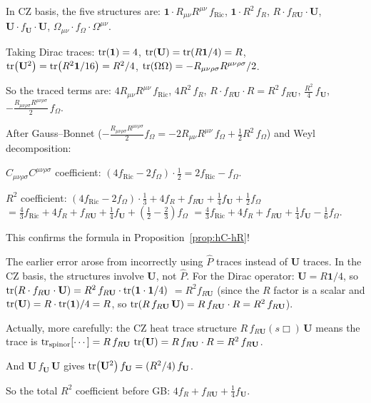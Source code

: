 \documentclass[11pt,a4paper]{article}
\newcommand{\Id}{\mathbf{1}}
\newcommand{\Ricsq}{R_{\mu\nu}R^{\mu\nu}}
\newcommand{\Rsq}{R_{\mu\nu\rho\sigma}R^{\mu\nu\rho\sigma}}
\newcommand{\Weylsq}{C_{\mu\nu\rho\sigma}C^{\mu\nu\rho\sigma}}
\theoremstyle{definition}
\theoremstyle{remark}
\begin{document}
In CZ basis, the five structures are:
$\Id\cdot\Ricsq\,f_{\text{Ric}}$,
$\Id\cdot R^2\,f_R$,
$R\cdot f_{R\mathbf{U}}\cdot\mathbf{U}$,
$\mathbf{U}\cdot f_{\mathbf{U}}\cdot\mathbf{U}$,
$\Omega_{\mu\nu}\cdot f_\Omega\cdot\Omega^{\mu\nu}$.

Taking Dirac traces:
$\tr(\Id) = 4$,
$\tr(\mathbf{U}) = \tr(R\Id/4) = R$,
$\tr(\mathbf{U}^2) = \tr(R^2\Id/16) = R^2/4$,
$\tr(\Omega\Omega) = -\Rsq/2$.

So the traced terms are:
$4\Ricsq\,f_{\text{Ric}}$,
$4R^2\,f_R$,
$R\cdot f_{R\mathbf{U}}\cdot R = R^2\,f_{R\mathbf{U}}$,
$\frac{R^2}{4}\,f_{\mathbf{U}}$,
$-\frac{\Rsq}{2}\,f_\Omega$.

After Gauss--Bonnet ($-\frac{\Rsq}{2}f_\Omega = -2\Ricsq\,f_\Omega + \frac{1}{2}R^2\,f_\Omega$) and Weyl decomposition:

$\Weylsq$ coefficient: $(4f_{\text{Ric}} - 2f_\Omega)\cdot\frac{1}{2} = 2f_{\text{Ric}} - f_\Omega$.

$R^2$ coefficient: $(4f_{\text{Ric}} - 2f_\Omega)\cdot\frac{1}{3}
+ 4f_R + f_{R\mathbf{U}} + \frac{1}{4}f_{\mathbf{U}} + \frac{1}{2}f_\Omega$
$= \frac{4}{3}f_{\text{Ric}} + 4f_R + f_{R\mathbf{U}} + \frac{1}{4}f_{\mathbf{U}}
+ (\frac{1}{2}-\frac{2}{3})f_\Omega$
$= \frac{4}{3}f_{\text{Ric}} + 4f_R + f_{R\mathbf{U}} + \frac{1}{4}f_{\mathbf{U}}
- \frac{1}{6}f_\Omega$.

This confirms the formula in Proposition~\ref{prop:hC-hR}!

The earlier error arose from incorrectly using $\hat{P}$ traces instead
of $\mathbf{U}$ traces.  In the CZ basis, the structures involve
$\mathbf{U}$, not $\hat{P}$.  For the Dirac operator:
$\mathbf{U} = R\Id/4$, so
$\tr(R\cdot f_{R\mathbf{U}}\cdot\mathbf{U}) = R^2\,f_{R\mathbf{U}}\cdot\tr(\Id\cdot\Id/4)$
$= R^2 f_{R\mathbf{U}}$ (since the $R$ factor is a scalar and
$\tr(\mathbf{U}) = R\cdot\tr(\Id)/4 = R$, so
$\tr(R\,f_{R\mathbf{U}}\,\mathbf{U}) = R\,f_{R\mathbf{U}}\cdot R = R^2\,f_{R\mathbf{U}}$).

Actually, more carefully: the CZ heat trace structure
$R\,f_{R\mathbf{U}}(s\Box)\,\mathbf{U}$ means the trace is
$\tr_{\text{spinor}}[\cdots] = R\,f_{R\mathbf{U}}\,\tr(\mathbf{U})
= R\,f_{R\mathbf{U}}\cdot R = R^2\,f_{R\mathbf{U}}$.

And $\mathbf{U}\,f_{\mathbf{U}}\,\mathbf{U}$ gives
$\tr(\mathbf{U}^2)\,f_{\mathbf{U}} = (R^2/4)\,f_{\mathbf{U}}$.

So the total $R^2$ coefficient before GB:
$4f_R + f_{R\mathbf{U}} + \frac{1}{4}f_{\mathbf{U}}$.
\end{document}
